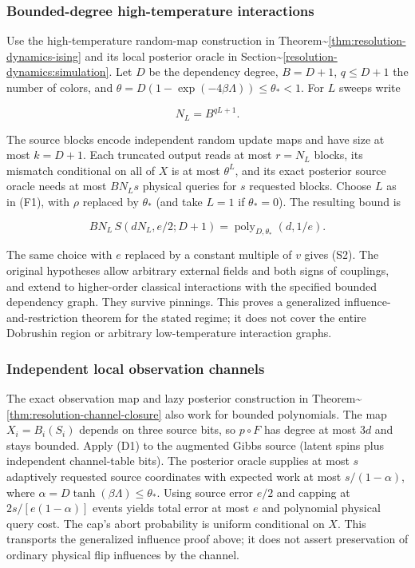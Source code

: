 \subsubsection{Bounded-degree high-temperature
interactions}\label{influence-recovery:bounded-degree-high-temperature-interactions}

Use the high-temperature random-map construction in
Theorem\textasciitilde{}\ref{thm:resolution-dynamics-ising} and its
local posterior oracle in
Section\textasciitilde{}\ref{resolution-dynamics:simulation}. Let \(D\)
be the dependency degree, \(B=D+1\), \(q\le D+1\) the number of colors,
and \(\theta=D(1-\exp(-4\beta\Lambda))\le\theta_*<1\). For \(L\) sweeps
write

\[
 N_L=B^{qL+1}.
\]

The source blocks encode independent random update maps and have size at
most \(k=D+1\). Each truncated output reads at most \(r=N_L\) blocks,
its mismatch conditional on all of \(X\) is at most \(\theta^L\), and
its exact posterior source oracle needs at most \(BN_Ls\) physical
queries for \(s\) requested blocks. Choose \(L\) as in (F1), with
\(\rho\) replaced by \(\theta_*\) (and take \(L=1\) if \(\theta_*=0\)).
The resulting bound is

\[
 B N_L\,S(dN_L,e/2;D+1)
 =\operatorname{poly}_{D,\theta_*}(d,1/e).
 \tag{D1}
\]

The same choice with \(e\) replaced by a constant multiple of \(v\)
gives (S2). The original hypotheses allow arbitrary external fields and
both signs of couplings, and extend to higher-order classical
interactions with the specified bounded dependency graph. They survive
pinnings. This proves a generalized influence-and-restriction theorem
for the stated regime; it does not cover the entire Dobrushin region or
arbitrary low-temperature interaction graphs.

\subsubsection{Independent local observation
channels}\label{influence-recovery:independent-local-observation-channels}

The exact observation map and lazy posterior construction in
Theorem\textasciitilde{}\ref{thm:resolution-channel-closure} also work
for bounded polynomials. The map \(X_i=B_i(S_i)\) depends on three
source bits, so \(p\circ F\) has degree at most \(3d\) and stays
bounded. Apply (D1) to the augmented Gibbs source (latent spins plus
independent channel-table bits). The posterior oracle supplies at most
\(s\) adaptively requested source coordinates with expected work at most
\(s/(1-\alpha)\), where \(\alpha=D\tanh(\beta\Lambda)\le\theta_*\).
Using source error \(e/2\) and capping at \(2s/[e(1-\alpha)]\) events
yields total error at most \(e\) and polynomial physical query cost. The
cap's abort probability is uniform conditional on \(X\). This transports
the generalized influence proof above; it does not assert preservation
of ordinary physical flip influences by the channel.
